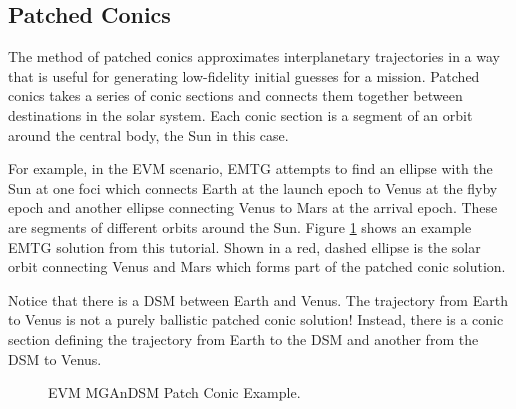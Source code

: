 \documentclass[11pt]{article}
\begin{document}
\subsection{Patched Conics}
\label{sec:patched_conics}

The method of patched conics approximates interplanetary trajectories in a way that is useful for generating low-fidelity initial guesses for a mission. Patched conics takes a series of conic sections and connects them together between destinations in the solar system. Each conic section is a segment of an orbit around the central body, the Sun in this case. 

\noindent For example, in the EVM scenario, \ac{EMTG} attempts to find an ellipse with the Sun at one foci which connects Earth at the launch epoch to Venus at the flyby epoch and another ellipse connecting Venus to Mars at the arrival epoch. These are segments of different orbits around the Sun. Figure \ref{fig:patched_conic_ex} shows an example \ac{EMTG} solution from this tutorial. Shown in a red, dashed ellipse is the solar orbit connecting Venus and Mars which forms part of the patched conic solution. 

\noindent Notice that there is a \ac{DSM} between Earth and Venus. The trajectory from Earth to Venus is not a purely ballistic patched conic solution! Instead, there is a conic section defining the trajectory from Earth to the \ac{DSM} and another from the \ac{DSM} to Venus.

\begin{figure}[H]
	\centering
	\caption{\label{fig:patched_conic_ex}EVM MGAnDSM Patch Conic Example.}
\end{figure}
\end{document}
